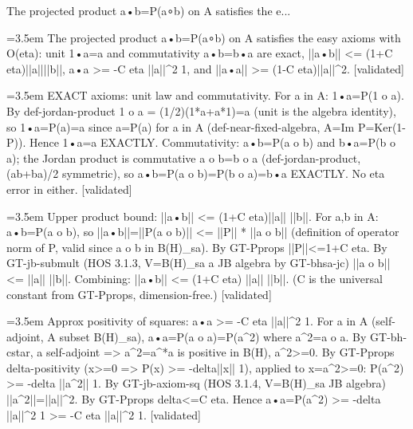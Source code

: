 \documentclass{article}
\newcommand{\step}[1]{\par\noindent\hangindent=3.5em\hangafter=1%
  \makebox[3.5em][l]{\textbf{#1.}}}
\newcommand{\steptag}[1]{\hfill{\small\textsf{[#1]}}}
\begin{document}
\begin{proofbox}{The projected product a•b=P(a∘b) on A satisfies the e...}
\step{1} The projected product a•b=P(a∘b) on A satisfies the easy axioms with O(eta): unit 1•a=a and commutativity a•b=b•a are exact, ||a•b|| <= (1+C eta)||a||||b||, a•a >= -C eta ||a||\textasciicircum{}2 1, and ||a•a|| >= (1-C eta)||a||\textasciicircum{}2. \steptag{validated} \\[6pt]
\step{1.1} EXACT axioms: unit law and commutativity. For a in A: 1•a=P(1 o a). By def-jordan-product 1 o a = (1/2)(1*a+a*1)=a (unit is the algebra identity), so 1•a=P(a)=a since a=P(a) for a in A (def-near-fixed-algebra, A=Im P=Ker(1-P)). Hence 1•a=a EXACTLY. Commutativity: a•b=P(a o b) and b•a=P(b o a); the Jordan product is commutative a o b=b o a (def-jordan-product, (ab+ba)/2 symmetric), so a•b=P(a o b)=P(b o a)=b•a EXACTLY. No eta error in either. \steptag{validated} \\[4pt]
\step{1.2} Upper product bound: ||a•b|| <= (1+C eta)||a|| ||b||. For a,b in A: a•b=P(a o b), so ||a•b||=||P(a o b)|| <= ||P|| * ||a o b|| (definition of operator norm of P, valid since a o b in B(H)\_sa). By GT-Pprops ||P||<=1+C eta. By GT-jb-submult (HOS 3.1.3, V=B(H)\_sa a JB algebra by GT-bhsa-jc) ||a o b|| <= ||a|| ||b||. Combining: ||a•b|| <= (1+C eta) ||a|| ||b||. (C is the universal constant from GT-Pprops, dimension-free.) \steptag{validated} \\[4pt]
\step{1.3} Approx positivity of squares: a•a >= -C eta ||a||\textasciicircum{}2 1. For a in A (self-adjoint, A subset B(H)\_sa), a•a=P(a o a)=P(a\textasciicircum{}2) where a\textasciicircum{}2=a o a. By GT-bh-cstar, a self-adjoint => a\textasciicircum{}2=a\textasciicircum{}*a is positive in B(H), a\textasciicircum{}2>=0. By GT-Pprops delta-positivity (x>=0 => P(x) >= -delta||x|| 1), applied to x=a\textasciicircum{}2>=0: P(a\textasciicircum{}2) >= -delta ||a\textasciicircum{}2|| 1. By GT-jb-axiom-sq (HOS 3.1.4, V=B(H)\_sa JB algebra) ||a\textasciicircum{}2||=||a||\textasciicircum{}2. By GT-Pprops delta<=C eta. Hence a•a=P(a\textasciicircum{}2) >= -delta ||a||\textasciicircum{}2 1 >= -C eta ||a||\textasciicircum{}2 1. \steptag{validated} \\[4pt]

\end{proofbox}
\end{document}
